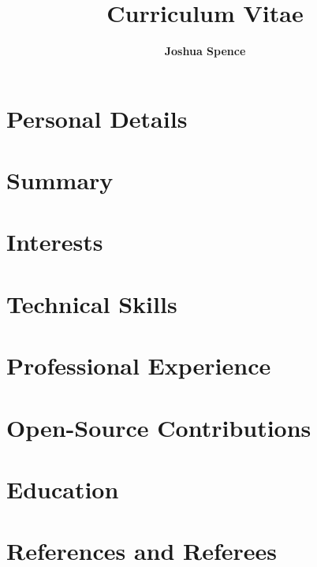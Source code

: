 \documentclass{article}
\title{\Huge{\textbf{Curriculum Vitae}}}
\author{\Large{\textbf{Joshua Spence}}}
\date{}
\newcommand{\cvsection}[2]{%
  \section*{#1}%
}
\begin{document}
\maketitle

\cvsection{Personal Details}{personal}
\cvsection{Summary}{summary}
\cvsection{Interests}{interests}
\newpage
\cvsection{Technical Skills}{skills}
\cvsection{Professional Experience}{experience}
\cvsection{Open-Source Contributions}{oss}
\cvsection{Education}{education}
\cvsection{References and Referees}{references}
\end{document}
